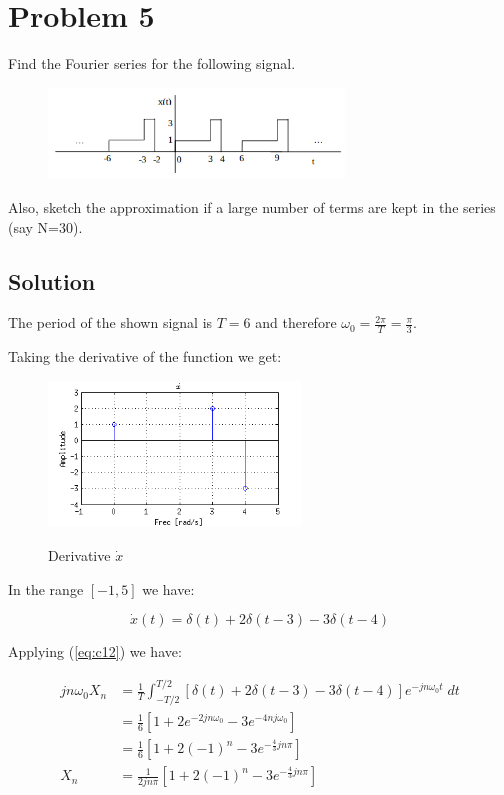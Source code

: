\section*{Problem 5}
Find the Fourier series for the following signal. 

\begin{figure}[H]
\caption*{}
\centering
\includegraphics[width=0.7\textwidth]{figs/c1p5.png}
\label{fig:c1p5}
\end{figure} 

Also, sketch the approximation 
if a large number of terms are kept in the series (say N=30).

\subsection*{Solution}

The period of the shown signal is $T=6$ and therefore 
$\omega_0 = \frac{2 \pi}{T} =  \frac{\pi}{3}$.

Taking the derivative of the function we get:
\begin{figure}[H]
\caption{Derivative $\dot{x}$}
\centering
\includegraphics[width=0.6\textwidth]{figs/c1p5a.png}
\label{fig:c1p5a}
\end{figure} 

In the range $[-1, 5]$ we have:

\begin{equation*}
\dot{x}(t) = \delta(t) + 2 \delta(t-3) -3 \delta(t-4)
\end{equation*} 

Applying (\ref{eq:c12}) we have:

\begin{equation*}
\begin{aligned}
j n \omega_0 X_n &= \frac{1}{T} \displaystyle\int_{- T/2}^{T/2}
	[\delta(t) + 2 \delta(t-3) -3 \delta(t-4)]  e^{-j n \omega_0 t} \; dt \\
&=\frac{1}{6} [1 + 2 e^{-2 j n \omega_0} - 3 e^{-4 n j \omega_0}] \\
&=\frac{1}{6} [1 + 2 (-1)^n - 3e^{-\frac{4}{3} j n \pi} ] \\
X_n &= \frac{1}{2 j n \pi}[1 + 2 (-1)^n - 3e^{-\frac{4}{3} j n \pi} ]
\end{aligned}
\end{equation*} 

